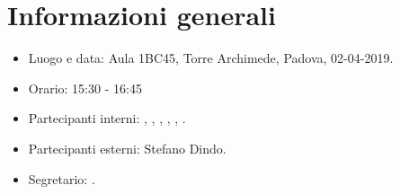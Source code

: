 \section{Informazioni generali}
\begin{itemize}
    \item Luogo e data: Aula 1BC45, Torre Archimede, Padova, 02-04-2019.
    \item Orario: 15:30 - 16:45
    \item Partecipanti interni: \valentin{}, \francesco{}, \daniele{}, \singh{}, \davide{}, \andrea{}.
    \item Partecipanti esterni: Stefano Dindo.
    \item Segretario: \singh{}.
\end{itemize}